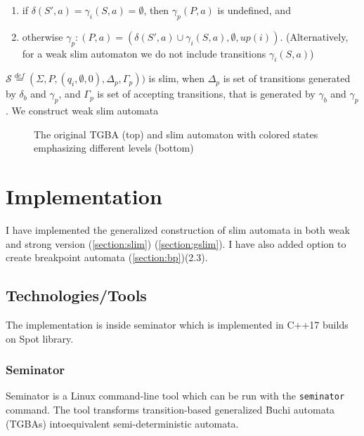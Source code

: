 \documentclass[
	digital
nolof, nolot
]{fithesis3}
\newcommand{\cS}{\mathcal{S}}
\newcommand{\eqdef}{\overset{def}{=}}
\begin{document}
		
			\begin{enumerate}
				\item if $\delta(S',a)=\gamma_{i}(S, a)=\emptyset$, then $ \gamma_{p}(P,a)$ is undefined, and
				\item otherwise $\gamma_p \colon (P,a) = (\delta(S',a)\cup \gamma_{i}(S, a), \emptyset, up(i))$. (Alternatively, for a weak slim automaton we do not include transitions $\gamma_{i}(S, a)$)
			\end{enumerate}
			$\cS\eqdef(\Sigma, P, (q_i,\emptyset,0), \Delta_p,\Gamma_p))$ is slim, when $\Delta_p$ is set of transitions generated by $\delta_b$ and $\gamma_p$, and $\Gamma_p$ is set of accepting transitions, that is generated by $\gamma_b$ and $\gamma_p$. We construct weak slim automata 
			
						
			\begin{figure}[ht]
				\begin{center}
					
					
				\end{center}
				\caption{The original TGBA (top) and slim automaton with colored states emphasizing different levels (bottom)  }
				\label{fig:slim:gg}
			\end{figure}
			

			
	\chapter{Implementation}
		I have implemented the generalized construction of slim automata in both weak and strong version  (\ref{section:slim}) (\ref{section:gslim}). I have also added option to create breakpoint automata (\ref{section:bp})(2.3).
		
		\section{Technologies/Tools}
		The implementation is inside seminator which is implemented in C++17 builds on Spot library. %
		\subsection{Seminator} 
		Seminator is a Linux command-line tool which can be run with the \texttt{seminator} command. The tool transforms transition-based generalized B̈uchi automata (TGBAs) intoequivalent semi-deterministic automata. \cite{blahoudek.20.cav}
		
\end{document}

